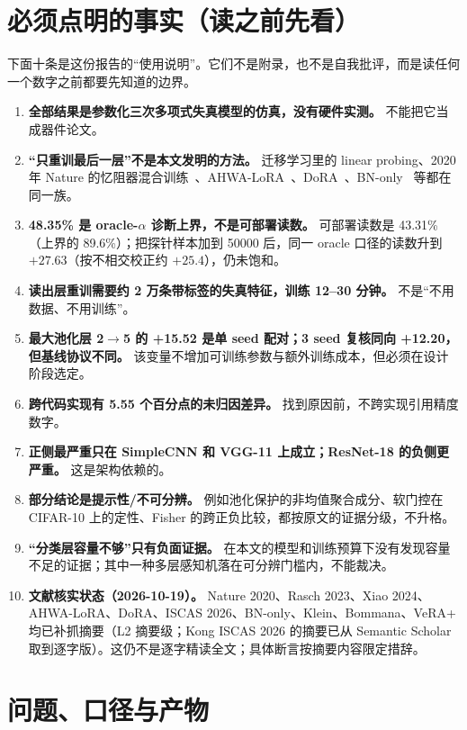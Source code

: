 \documentclass[11pt,a4paper]{ctexart}
\begin{document}
\section{必须点明的事实（读之前先看）}
\label{sec:must-state}

下面十条是这份报告的“使用说明”。它们不是附录，也不是自我批评，而是读任何一个数字之前都要先知道的边界。

\begin{enumerate}[leftmargin=2em,itemsep=2pt]
  \item \textbf{全部结果是参数化三次多项式失真模型的仿真，没有硬件实测。} 不能把它当成器件论文。
  \item \textbf{“只重训最后一层”不是本文发明的方法。} 迁移学习里的 linear probing、2020 年 Nature 的忆阻器混合训练~\cite{yao2020}、AHWA-LoRA~\cite{ahwa_lora}、DoRA~\cite{dora}、BN-only~\cite{bn_only} 等都在同一族。
  \item \textbf{48.35\% 是 oracle-$\alpha$ 诊断上界，不是可部署读数。} 可部署读数是 43.31\%（上界的 89.6\%）；把探针样本加到 50000 后，同一 oracle 口径的读数升到 $+27.63$（按不相交校正约 $+25.4$），仍未饱和。
  \item \textbf{读出层重训需要约 2 万条带标签的失真特征，训练 12--30 分钟。} 不是“不用数据、不用训练”。
  \item \textbf{最大池化层 2$\to$5 的 +15.52 是单 seed 配对；3 seed 复核同向 +12.20，但基线协议不同。} 该变量不增加可训练参数与额外训练成本，但必须在设计阶段选定。
  \item \textbf{跨代码实现有 5.55 个百分点的未归因差异。} 找到原因前，不跨实现引用精度数字。
  \item \textbf{正侧最严重只在 SimpleCNN 和 VGG-11 上成立；ResNet-18 的负侧更严重。} 这是架构依赖的。
  \item \textbf{部分结论是提示性/不可分辨。} 例如池化保护的非均值聚合成分、软门控在 CIFAR-10 上的定性、Fisher 的跨正负比较，都按原文的证据分级，不升格。
  \item \textbf{“分类层容量不够”只有负面证据。} 在本文的模型和训练预算下没有发现容量不足的证据；其中一种多层感知机落在可分辨门槛内，不能裁决。
  \item \textbf{文献核实状态（2026-10-19）。} Nature 2020、Rasch 2023、Xiao 2024、AHWA-LoRA、DoRA、ISCAS 2026、BN-only、Klein、Bommana、VeRA+ 均已补抓摘要（L2 摘要级；Kong ISCAS 2026 的摘要已从 Semantic Scholar 取到逐字版）。这仍不是逐字精读全文；具体断言按摘要内容限定措辞。
\end{enumerate}

\section{问题、口径与产物}
\label{sec:setup}
\end{document}
